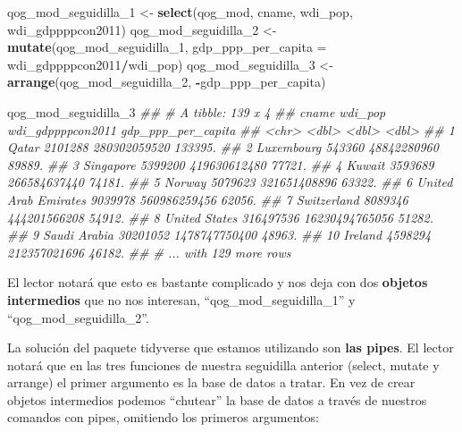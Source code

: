 \documentclass[]{book}
\newenvironment{Shaded}{\begin{snugshade}}{\end{snugshade}}
\newcommand{\CommentTok}[1]{\textcolor[rgb]{0.56,0.35,0.01}{\textit{#1}}}
\newcommand{\DataTypeTok}[1]{\textcolor[rgb]{0.13,0.29,0.53}{#1}}
\newcommand{\DecValTok}[1]{\textcolor[rgb]{0.00,0.00,0.81}{#1}}
\newcommand{\KeywordTok}[1]{\textcolor[rgb]{0.13,0.29,0.53}{\textbf{#1}}}
\newcommand{\NormalTok}[1]{#1}
\newcommand{\OperatorTok}[1]{\textcolor[rgb]{0.81,0.36,0.00}{\textbf{#1}}}
\newcommand{\StringTok}[1]{\textcolor[rgb]{0.31,0.60,0.02}{#1}}
\begin{document}
\begin{Shaded}
\begin{Highlighting}[]
\NormalTok{qog_mod_seguidilla_}\DecValTok{1}\NormalTok{ <-}\StringTok{ }\KeywordTok{select}\NormalTok{(qog_mod, cname, wdi_pop, wdi_gdppppcon2011)}
\NormalTok{qog_mod_seguidilla_}\DecValTok{2}\NormalTok{ <-}\StringTok{ }\KeywordTok{mutate}\NormalTok{(qog_mod_seguidilla_}\DecValTok{1}\NormalTok{, }
                               \DataTypeTok{gdp_ppp_per_capita =}\NormalTok{ wdi_gdppppcon2011}\OperatorTok{/}\NormalTok{wdi_pop)}
\NormalTok{qog_mod_seguidilla_}\DecValTok{3}\NormalTok{ <-}\StringTok{ }\KeywordTok{arrange}\NormalTok{(qog_mod_seguidilla_}\DecValTok{2}\NormalTok{, }\OperatorTok{-}\NormalTok{gdp_ppp_per_capita)}
\end{Highlighting}
\end{Shaded}

\begin{Shaded}
\begin{Highlighting}[]
\NormalTok{qog_mod_seguidilla_}\DecValTok{3}
\CommentTok{## # A tibble: 139 x 4}
\CommentTok{##    cname                  wdi_pop wdi_gdppppcon2011 gdp_ppp_per_capita}
\CommentTok{##    <chr>                    <dbl>             <dbl>              <dbl>}
\CommentTok{##  1 Qatar                  2101288      280302059520            133395.}
\CommentTok{##  2 Luxembourg              543360       48842280960             89889.}
\CommentTok{##  3 Singapore              5399200      419630612480             77721.}
\CommentTok{##  4 Kuwait                 3593689      266584637440             74181.}
\CommentTok{##  5 Norway                 5079623      321651408896             63322.}
\CommentTok{##  6 United Arab Emirates   9039978      560986259456             62056.}
\CommentTok{##  7 Switzerland            8089346      444201566208             54912.}
\CommentTok{##  8 United States        316497536    16230494765056             51282.}
\CommentTok{##  9 Saudi Arabia          30201052     1478747750400             48963.}
\CommentTok{## 10 Ireland                4598294      212357021696             46182.}
\CommentTok{## # ... with 129 more rows}
\end{Highlighting}
\end{Shaded}

El lector notará que esto es bastante complicado y nos deja con dos
\textbf{objetos intermedios} que no nos interesan,
``qog\_mod\_seguidilla\_1'' y ``qog\_mod\_seguidilla\_2''.

La solución del paquete tidyverse que estamos utilizando son \textbf{las
pipes}. El lector notará que en las tres funciones de nuestra seguidilla
anterior (select, mutate y arrange) el primer argumento es la base de
datos a tratar. En vez de crear objetos intermedios podemos ``chutear''
la base de datos a través de nuestros comandos con pipes, omitiendo los
primeros argumentos:
\end{document}
